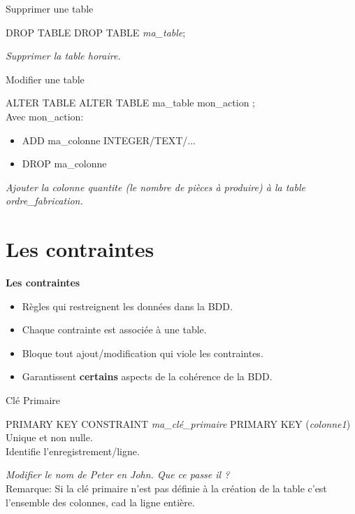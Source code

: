 \documentclass[xetex,dvipsnames]{beamer}
\begin{document}
\begin{frame}{Supprimer une table}
	\begin{alertblock}{DROP TABLE}
	DROP TABLE \textit{ma\_table};
	\end{alertblock}
	\textit{Supprimer la table horaire.}
\end{frame}


\begin{frame}{Modifier une table}
	\begin{alertblock}{ALTER TABLE}
	ALTER TABLE ma\_table mon\_action ;\\
	Avec mon\_action:
	\begin{itemize}
		\item ADD ma\_colonne INTEGER/TEXT/...
		\item DROP ma\_colonne
	\end{itemize}
	\end{alertblock}
	\textit{Ajouter la colonne quantite (le nombre de pièces à produire) à la table ordre\_fabrication. }
\end{frame}




 
\section{Les contraintes}
\begin{frame}
\begin{center}
{\LARGE \textbf{Les contraintes}}
\end{center}
\pause
\begin{itemize}
	\item Règles qui restreignent les données dans la BDD.\\
	\item Chaque contrainte est associée à une table.\\
	\item Bloque tout ajout/modification qui viole les contraintes.
	\item Garantissent \textbf{certains} aspects de la cohérence de la BDD.
\end{itemize}
\end{frame}

\begin{frame}{Clé Primaire}
	\begin{alertblock}{PRIMARY KEY}
		CONSTRAINT \textit{ma\_clé\_primaire} PRIMARY KEY (\textit{colonne1})\\
		Unique et non nulle.\\
		Identifie l'enregistrement/ligne.\\
	\end{alertblock}
	
	\textit{Modifier le nom de Peter en John. Que ce passe il ? }\\
\vspace*{1em}
	Remarque: Si la clé primaire n'est pas définie à la création de la table \pause c'est l'ensemble des colonnes, cad la ligne entière.
	
	
\end{frame}
\end{document}
